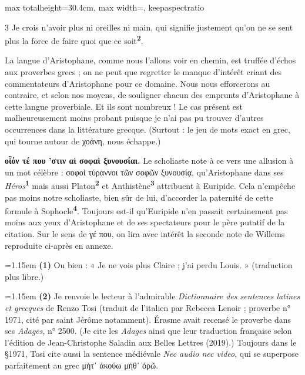 \documentclass[11pt,twoside]{book}
\newcommand{\italique}[1]{\textit{#1}}
\newcommand{\latin}[1]{\textit{#1}}
\newcommand{\marqueur}[1]{\textsuperscript{\color{rubricRed}\textbf{#1}}}
\begin{document}
\begin{adjustbox}{max totalheight=30.4cm, max width=\textwidth, keepaspectratio}
\begin{minipage}{\textwidth}
{\begin{multicols}{3}
{Je crois n'avoir plus ni oreilles ni main,} qui signifie justement qu'on ne se sent plus la force de faire quoi que ce soit\marqueur{2}.\\
\par\vspace{1.5pt}
\noindent La langue d'Aristophane, comme nous l'allons voir en chemin, est truffée d'échos aux proverbes grecs ; on ne peut que regretter le manque d'intérêt criant des commentateurs d'Aristophane pour ce domaine. Nous nous efforcerons au contraire, et selon nos moyens, de souligner chacun des emprunts d'Aristophane à cette langue proverbiale. Et ils sont nombreux ! Le cas présent est malheureusement moins probant puisque je n'ai pas pu trouver d'autres occurrences dans la littérature grecque. (Surtout : le jeu de mots exact en grec, qui tourne autour de χοάνη, nous échappe.)
\par\vspace{1.5pt}
 \textbf{οἷόν τέ που 'στιν αἱ σοφαὶ ξυνουσίαι.} Le scholiaste note à ce vers une allusion à un mot célèbre : σοφοὶ τύραννοι τῶν σοφῶν ξυνουσίᾳ, qu'Aristophane dans ses \italique{Héros}\marqueur{1} mais aussi Platon\marqueur{2} et Anthistène\marqueur{3} attribuent à Euripide. Cela n'empêche pas moins notre scholiaste, bien sûr de lui, d'accorder la paternité de cette formule à Sophocle\marqueur{4}. Toujours est-il qu'Euripide n'en passait certainement pas moins aux yeux d'Aristophane et de ses spectateurs pour le père putatif de la citation. Sur le sens de γέ που, on lira avec intérêt la seconde note de Willems reproduite ci-après en annexe.
\par\vspace{1.5pt}
\par\vspace{1.2pt}\par\nopagebreak\vspace{1pt}\noindent\hangindent=1.15em {\color{sepiaNote}\textbf{(1)}} Ou bien : « Je ne vois plus Claire ; j'ai perdu Louis. » (traduction plus libre.)
\par\vspace{1.5pt}
\noindent\hangindent=1.15em {\color{sepiaNote}\textbf{(2)}} Je renvoie le lecteur à l'admirable \italique{Dictionnaire des sentences latines et grecques} de Renzo Tosi (traduit de l'italien par Rebecca Lenoir ; proverbe n° 1971, cité par saint Jérôme notamment). Érasme avait recensé le proverbe dans ses \italique{Adages}, n° 2500. (Je cite les \italique{Adages} ainsi que leur traduction française selon l'édition de Jean-Christophe Saladin aux Belles Lettres (2019).) Toujours dans le §1971, Tosi cite aussi la sentence médiévale \latin{Nec audio nec video}, qui se superpose parfaitement au grec μήτ᾽ ἀκούω μήθ᾽ ὁρῶ.

\end{multicols}}
\end{minipage}
\end{adjustbox}
\end{document}
